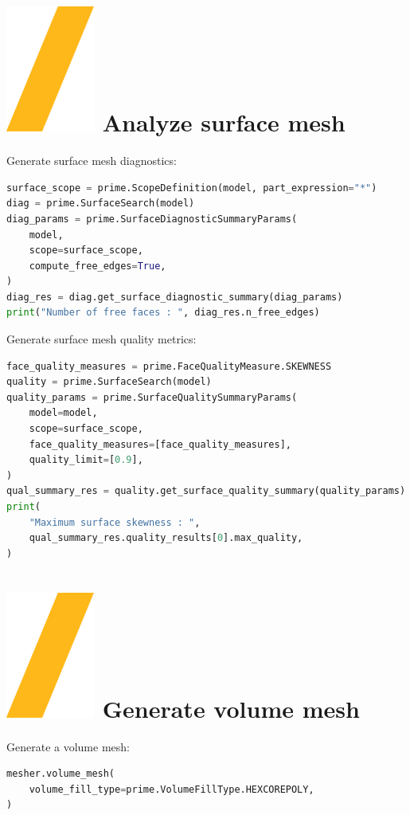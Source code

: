 \documentclass[9pt,landscape]{article}
\begin{document}
\begin{multicols}{3}
\section{\includegraphics[height=\fontcharht\font`\S]{slash.png} Analyze surface mesh}
Generate surface mesh diagnostics: 
\begin{lstlisting}[language=Python]
surface_scope = prime.ScopeDefinition(model, part_expression="*")
diag = prime.SurfaceSearch(model)
diag_params = prime.SurfaceDiagnosticSummaryParams(
    model,
    scope=surface_scope,
    compute_free_edges=True,
)
diag_res = diag.get_surface_diagnostic_summary(diag_params)
print("Number of free faces : ", diag_res.n_free_edges)
\end{lstlisting}

Generate surface mesh quality metrics:
\begin{lstlisting}[language=Python]
face_quality_measures = prime.FaceQualityMeasure.SKEWNESS
quality = prime.SurfaceSearch(model)
quality_params = prime.SurfaceQualitySummaryParams(
    model=model,
    scope=surface_scope,
    face_quality_measures=[face_quality_measures],
    quality_limit=[0.9],
)
qual_summary_res = quality.get_surface_quality_summary(quality_params)
print(
    "Maximum surface skewness : ",
    qual_summary_res.quality_results[0].max_quality,
)
\end{lstlisting}

\section{\includegraphics[height=\fontcharht\font`\S]{slash.png} Generate volume mesh}
Generate a volume mesh:
\begin{lstlisting}[language=Python]
mesher.volume_mesh(
    volume_fill_type=prime.VolumeFillType.HEXCOREPOLY,
)
\end{lstlisting}


\end{multicols}
\end{document}
